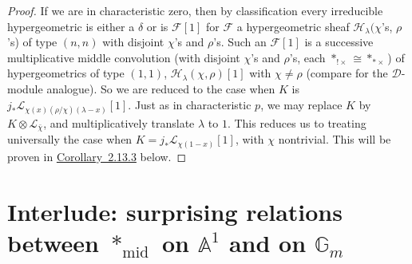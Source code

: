 \begin{proof}
If we are in characteristic zero, then by classification every irreducible
hypergeometric is either a \(\delta\) or is \(\mathcal{F}[1]\) for
\(\mathcal{F}\) a hypergeometric sheaf
\(\mathcal{H}_{\lambda}(\chi\)'s, \(\rho\)'s) of type \((n,n)\) with disjoint
\(\chi\)'s and \(\rho\)'s. Such an \(\mathcal{F}[1]\) is a successive
multiplicative middle convolution (with disjoint \(\chi\)'s and \(\rho\)'s,
each \(*_{!\times}\cong *_{*\times}\)) of hypergeometrics of type \((1,1)\),
\(\mathcal{H}_{\lambda}(\chi,\rho)[1]\) with \(\chi\ne\rho\) (compare
\cite[5.3.1]{Ka-ESDE} for the \(\mathcal{D}\)-module analogue). So we are
reduced to the case when \(K\) is
\(j_*\mathcal{L}_{\chi(x)(\rho/\chi)(\lambda-x)}[1]\). Just as in
characteristic \(p\), we may replace \(K\) by
\(K\otimes\mathcal{L}_{\bar{\chi}}\), and multiplicatively translate
\(\lambda\) to \(1\). This reduces us to treating universally the case when
\(K=j_*\mathcal{L}_{\chi(1-x)}[1]\), with \(\chi\) nontrivial. This will be
proven in \hyperref[cor:2.13.3]{Corollary~2.13.3} below.
\end{proof}

\section[Relations between middle convolution on
\texorpdfstring{\(\mathbb{A}^1\)}{A1} and
\texorpdfstring{\(\mathbb{G}_m\)}{Gm}]{Interlude: surprising relations between
\texorpdfstring{\(*_{\mathrm{mid}}\)}{*mid} on
\texorpdfstring{\(\mathbb{A}^1\)}{A1} and on
\texorpdfstring{\(\mathbb{G}_m\)}{Gm}}\label{sec:2.13}

